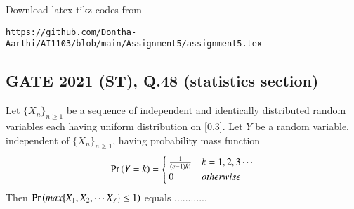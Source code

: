 \documentclass[journal,12pt,twocolumn]{IEEEtran}
\begin{document}
Download latex-tikz codes from 

\begin{lstlisting}
https://github.com/Dontha-Aarthi/AI1103/blob/main/Assignment5/assignment5.tex
\end{lstlisting}
\begin{center}
  \section{\textbf{GATE 2021 (ST), Q.48 (statistics section)}} 
\end{center}
    Let $\{X_n\}_{n\ge 1}$ be a sequence of independent and identically distributed random variables each having uniform distribution on [0,3]. Let $Y$ be a random variable, independent of $\{X_n\}_{n\ge 1}$, having probability mass function
\begin{align}
\Pr\left(Y=k\right) = 
\begin{cases}
\frac{1}{(e-1)k!} & k=1,2,3\cdots \\
0 & otherwise
\end{cases}
\end{align}
Then $\Pr\left(max\{X_1,X_2,\cdots X_Y\}\le 1\right)$ equals ............\\
\end{document}
